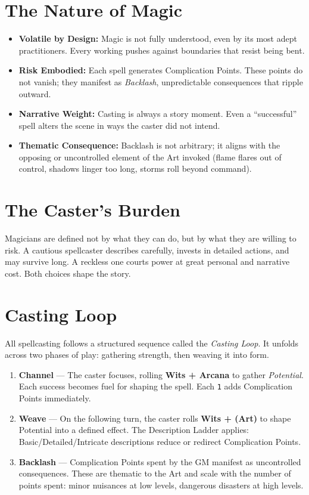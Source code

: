 \documentclass[12pt]{book}
\begin{document}
\section{The Nature of Magic}
\begin{itemize}
  \item \textbf{Volatile by Design:} Magic is not fully understood, even by its most adept practitioners. Every working pushes against boundaries that resist being bent.  
  \item \textbf{Risk Embodied:} Each spell generates Complication Points. These points do not vanish; they manifest as \emph{Backlash}, unpredictable consequences that ripple outward.  
  \item \textbf{Narrative Weight:} Casting is always a story moment. Even a “successful” spell alters the scene in ways the caster did not intend.  
  \item \textbf{Thematic Consequence:} Backlash is not arbitrary; it aligns with the opposing or uncontrolled element of the Art invoked (flame flares out of control, shadows linger too long, storms roll beyond command).  
\end{itemize}

\section{The Caster’s Burden}
Magicians are defined not by what they can do, but by what they are willing to risk.  
A cautious spellcaster describes carefully, invests in detailed actions, and may survive long. A reckless one courts power at great personal and narrative cost. Both choices shape the story.

\section{Casting Loop}

All spellcasting follows a structured sequence called the \emph{Casting Loop}.  
It unfolds across two phases of play: gathering strength, then weaving it into form.

\begin{enumerate}
  \item \textbf{Channel} — The caster focuses, rolling \textbf{Wits + Arcana} to gather \emph{Potential}.  
  Each success becomes fuel for shaping the spell. Each \texttt{1} adds Complication Points immediately.  
  \item \textbf{Weave} — On the following turn, the caster rolls \textbf{Wits + (Art)} to shape Potential into a defined effect.  
  The Description Ladder applies: Basic/Detailed/Intricate descriptions reduce or redirect Complication Points.  
  \item \textbf{Backlash} — Complication Points spent by the GM manifest as uncontrolled consequences.  
  These are thematic to the Art and scale with the number of points spent: minor nuisances at low levels, dangerous disasters at high levels.  
\end{enumerate}
\end{document}

